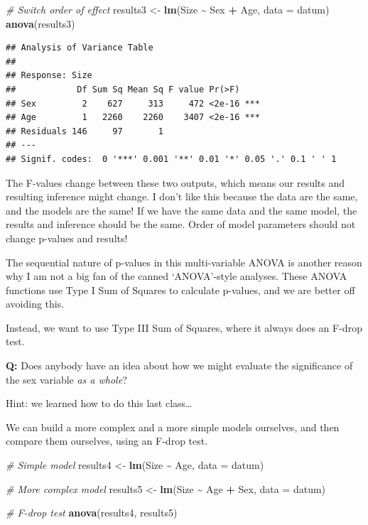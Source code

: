 \documentclass[
]{article}
\newenvironment{Shaded}{\begin{snugshade}}{\end{snugshade}}
\newcommand{\AttributeTok}[1]{\textcolor[rgb]{0.13,0.29,0.53}{#1}}
\newcommand{\CommentTok}[1]{\textcolor[rgb]{0.56,0.35,0.01}{\textit{#1}}}
\newcommand{\FunctionTok}[1]{\textcolor[rgb]{0.13,0.29,0.53}{\textbf{#1}}}
\newcommand{\NormalTok}[1]{#1}
\newcommand{\OtherTok}[1]{\textcolor[rgb]{0.56,0.35,0.01}{#1}}
\newcommand{\SpecialCharTok}[1]{\textcolor[rgb]{0.81,0.36,0.00}{\textbf{#1}}}
\begin{document}
\begin{Shaded}
\begin{Highlighting}[]
\CommentTok{\# Switch order of effect}
\NormalTok{results3 }\OtherTok{\textless{}{-}} \FunctionTok{lm}\NormalTok{(Size }\SpecialCharTok{\textasciitilde{}}\NormalTok{ Sex }\SpecialCharTok{+}\NormalTok{ Age, }\AttributeTok{data =}\NormalTok{ datum)}
\FunctionTok{anova}\NormalTok{(results3)}
\end{Highlighting}
\end{Shaded}

\begin{verbatim}
## Analysis of Variance Table
## 
## Response: Size
##            Df Sum Sq Mean Sq F value Pr(>F)    
## Sex         2    627     313     472 <2e-16 ***
## Age         1   2260    2260    3407 <2e-16 ***
## Residuals 146     97       1                   
## ---
## Signif. codes:  0 '***' 0.001 '**' 0.01 '*' 0.05 '.' 0.1 ' ' 1
\end{verbatim}

The F-values change between these two outputs, which means our results
and resulting inference might change. I don't like this because the data
are the same, and the models are the same! If we have the same data and
the same model, the results and inference should be the same. Order of
model parameters should not change p-values and results!

The sequential nature of p-values in this multi-variable ANOVA is
another reason why I am not a big fan of the canned `ANOVA'-style
analyses. These ANOVA functions use Type I Sum of Squares to calculate
p-values, and we are better off avoiding this.

Instead, we want to use Type III Sum of Squares, where it always does an
F-drop test.

\textbf{Q:} Does anybody have an idea about how we might evaluate the
significance of the sex variable \emph{as a whole}?

Hint: we learned how to do this last class\ldots{}

We can build a more complex and a more simple models ourselves, and then
compare them ourselves, using an F-drop test.

\begin{Shaded}
\begin{Highlighting}[]
\CommentTok{\# Simple model}
\NormalTok{results4 }\OtherTok{\textless{}{-}} \FunctionTok{lm}\NormalTok{(Size }\SpecialCharTok{\textasciitilde{}}\NormalTok{ Age, }\AttributeTok{data =}\NormalTok{ datum)}

\CommentTok{\# More complex model}
\NormalTok{results5 }\OtherTok{\textless{}{-}} \FunctionTok{lm}\NormalTok{(Size }\SpecialCharTok{\textasciitilde{}}\NormalTok{ Age }\SpecialCharTok{+}\NormalTok{ Sex, }\AttributeTok{data =}\NormalTok{ datum)}

\CommentTok{\# F{-}drop test}
\FunctionTok{anova}\NormalTok{(results4, results5)}
\end{Highlighting}
\end{Shaded}
\end{document}
